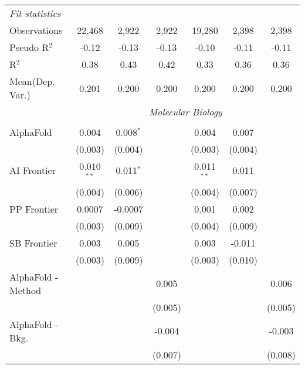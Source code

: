 \begin{tabular}{lcccccc}
   \midrule
   \emph{Fit statistics}\\
   Observations                  & 22,468        & 2,922        & 2,922          & 19,280        & 2,398        & 2,398\\  
   Pseudo R$^2$                  & -0.12         & -0.13        & -0.13          & -0.10         & -0.11        & -0.11\\  
   R$^2$                         & 0.38          & 0.43         & 0.42           & 0.33          & 0.36         & 0.36\\  
Mean(Dep. Var.) & 0.201 & 0.200 & 0.200 & 0.200 & 0.200 & 0.200 \\
   
 & \multicolumn{6}{c}{\textit{Molecular Biology}} \\ \\
   AlphaFold                     & 0.004        & 0.008$^{*}$ &                & 0.004        & 0.007   &   \\   
                                 & (0.003)      & (0.004)     &                & (0.003)      & (0.004) &   \\   
   AI Frontier                   & 0.010$^{**}$ & 0.011$^{*}$ &                & 0.011$^{**}$ & 0.011   &   \\   
                                 & (0.004)      & (0.006)     &                & (0.004)      & (0.007) &   \\   
   PP Frontier                   & 0.0007       & -0.0007     &                & 0.001        & 0.002   &   \\   
                                 & (0.003)      & (0.009)     &                & (0.004)      & (0.009) &   \\   
   SB Frontier                   & 0.003        & 0.005       &                & 0.003        & -0.011  &   \\   
                                 & (0.003)      & (0.009)     &                & (0.003)      & (0.010) &   \\   
   AlphaFold - Method            &              &             & 0.005          &              &         & 0.006\\   
                                 &              &             & (0.005)        &              &         & (0.005)\\   
   AlphaFold - Bkg.              &              &             & -0.004         &              &         & -0.003\\   
                                 &              &             & (0.007)        &              &         & (0.008)\\   

\end{tabular}
